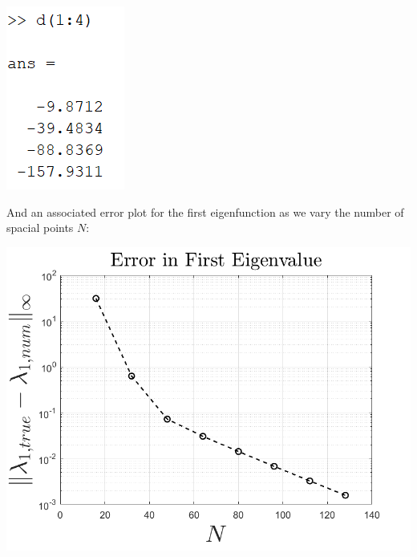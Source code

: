 \documentclass{article}
\begin{document}
\begin{itemize}
\begin{center}
        \newline
        \includegraphics{helmholtzeig.png}
    \end{center}
    And an associated error plot for the first eigenfunction as we vary the number of spacial points $N$:
    \begin{center}
        \includegraphics[scale = 0.5]{helmholtzeigerror.png}
    \end{center}
    


\end{itemize}
\end{document}
